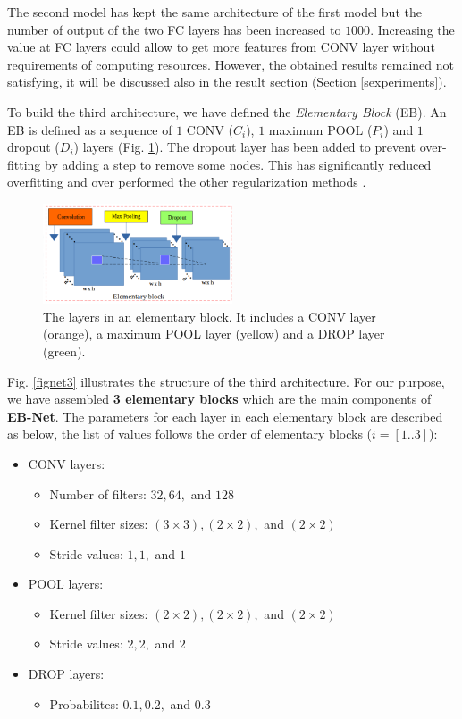 \documentclass[review]{elsarticle}
\begin{document}
The second model has kept the same architecture of the first model but
the number of output of the two FC layers has been increased to
$1000$. Increasing the value at FC layers could allow to get more
features from CONV layer without requirements of computing
resources. However, the obtained results remained not satisfying, it
will be discussed also in the result section (Section
\ref{sexperiments}).


To build the third architecture, we have defined the
\textit{Elementary Block} (EB). An EB is defined as a sequence of $1$
CONV ($C_{i}$), $1$ maximum POOL ($P_i$) and $1$ dropout ($D_i$)
layers (Fig. \ref{figelementary}). The dropout layer has been added to
prevent over-fitting by adding a step to remove some nodes. This has
significantly reduced overfitting and over performed the other
regularization methods \cite{srivastava2014dropout}.


\begin{figure}[h]
	\centering
	\includegraphics[width=0.5\textwidth]{images/elementary_block}
	\caption{The layers in an elementary block. It includes a CONV layer (orange), a maximum POOL layer (yellow) and a DROP layer (green).}
	\label{figelementary}
\end{figure}

Fig. \ref{fignet3} illustrates the structure of the third
architecture. For our purpose, we have assembled \textbf{3 elementary
  blocks} which are the main components of \textbf{EB-Net}. The
parameters for each layer in each elementary block are described as
below, the list of values follows the order of elementary blocks ($i =
[1..3]$):

\begin{itemize}
	\item CONV layers:
	\begin{itemize}
		\item Number of filters: $32, 64, $ and $128$
		\item Kernel filter sizes: $(3 \times 3), (2 \times 2), $ and $(2 \times 2)$
		\item Stride values: $1, 1, $ and $1$ 
	\end{itemize}
	\item POOL layers:
		\begin{itemize}
			\item Kernel filter sizes: $(2 \times 2), (2 \times 2), $ and $(2 \times 2)$
			\item Stride values: $2, 2, $ and $2$
		\end{itemize}
	\item DROP layers:
		\begin{itemize}
			\item Probabilites: $0.1, 0.2, $ and $0.3$
		\end{itemize}
\end{itemize}
\end{document}
